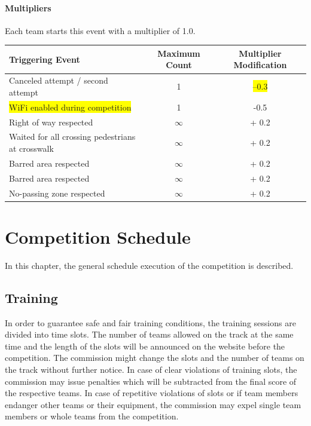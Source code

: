\documentclass[a4paper]{report}
\begin{document}
{{\subsubsection{Multipliers}
\label{obstacle_multipliers}

Each team starts this event with a multiplier of 1.0. 

\begin{table}[H]
\begin{tabular}{@{}lcc@{}}
\toprule
\textbf{Triggering Event}                        & \textbf{Maximum Count} & \textbf{Multiplier Modification} \\ \midrule
Canceled attempt / second attempt                & 1                      & \colorbox{yellow}{–0.3}         \\
\colorbox{yellow}{WiFi enabled during competition} & 1    & -0.5 \\
Right of way respected                           & $\infty$               & + 0.2                            \\
Waited for all crossing pedestrians at crosswalk & $\infty$               & + 0.2                            \\
Barred area respected                            & $\infty$               & + 0.2                            \\
Barred area respected                            & $\infty$               & + 0.2                            \\
No-passing zone respected                        & $\infty$               & + 0.2                            \\ 
\bottomrule
\end{tabular}
\end{table}

\chapter{Competition Schedule} 

In this chapter, the general schedule execution of the competition is described. 

\section{Training} 

In order to guarantee safe and fair training conditions, the training sessions are divided into time slots. The number of teams allowed on the track at the same time and the length of the slots will be announced on the website before the competition. The commission might change the slots and the number of teams on the track without further notice. In case of clear violations of training slots, the commission may issue penalties which will be subtracted from the final score of the respective teams. In case of repetitive violations of slots or if team members endanger other teams or their equipment, the commission may expel single team members or whole teams from the competition. 

}}
\end{document}

